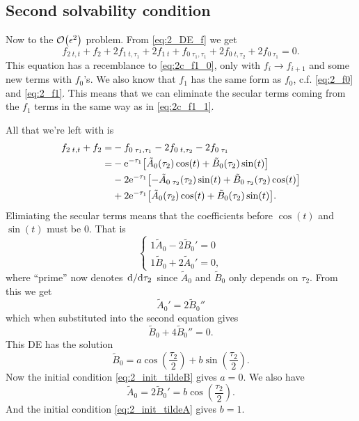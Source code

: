 \documentclass[11pt,letter, swedish, english
]{article}
\begin{document}
\subsection{Second solvability condition}
Now to the $\order{\epsilon^2}$ problem. From \eqref{eq:2_DE_f} we get
\begin{equation}
f_{2\;t,t}+f_2 + 2f_{1\;t,\tau_1} +2f_{1\;t}
+f_{0\;\tau_1,\tau_1}+2f_{0\;t,\tau_2}+2f_{0\;\tau_1}
=0.
\end{equation}
This equation has a recemblance to \eqref{eq:2c_f1_0}, only with
$f_i\to f_{i+1}$ and some new terms with $f_0$'s. We also know that
$f_1$ has the same form as $f_0$, c.f. \eqref{eq:2_f0} and
\eqref{eq:2_f1}. This means that we can eliminate the secular terms
coming from the $f_1$ terms in the same way as in
\eqref{eq:2c_f1_1}. 

All that we're left with is
\begin{equation}
\begin{aligned}
f_{2\;t,t}+f_2 =& %
-f_{0\;\tau_1,\tau_1}-2f_{0\;t,\tau_2}-2f_{0\;\tau_1}\\
=& -\ee^{-\tau_1}
\qty[\tilde{A}_0(\tau_2)\cos(t)+\tilde{B}_0(\tau_2)\sin(t)]\\
&-2\ee^{-\tau_1}
\qty[-\tilde{A}_{0\;\tau_2}(\tau_2)\sin(t)+\tilde{B}_{0\;\tau_2}(\tau_2)\cos(t)]\\
&+2\ee^{-\tau_1}
\qty[\tilde{A}_{0}(\tau_2)\cos(t)+\tilde{B}_0(\tau_2)\sin(t)].
\end{aligned}
\end{equation}
Elimiating the secular terms means that the coefficients before
$\cos(t)$ and $\sin(t)$ must be 0. That is
\begin{equation}
\begin{cases}
1\tilde{A}_{0}-2\tilde{B}_{0}'=0\\
1\tilde{B}_{0}+2\tilde{A}_{0}'=0,
\end{cases}
\end{equation}
where ``prime'' now denotes $\dv*{\tau_2}$ since $\tilde{A}_0$ and
$\tilde{B}_0$ only depends on $\tau_2$.
From this we get
\begin{equation}
\tilde{A}_{0}'=2\tilde{B}_{0}''
\end{equation}
which when substituted into the second equation gives
\begin{equation}
\tilde{B}_0+4\tilde{B}_0''=0.
\end{equation}
This DE has the solution
\begin{equation}
\tilde{B}_0=a\cos(\frac{\tau_2}{2})+b\sin(\frac{\tau_2}{2}).
\end{equation}
Now the initial condition \eqref{eq:2_init_tildeB} gives $a=0$. We
also have
\begin{equation}
\tilde{A}_{0}=2\tilde{B}_{0}'=b\cos(\frac{\tau_2}{2}).
\end{equation}
And the initial condition \eqref{eq:2_init_tildeA} gives $b=1$.
\end{document}
